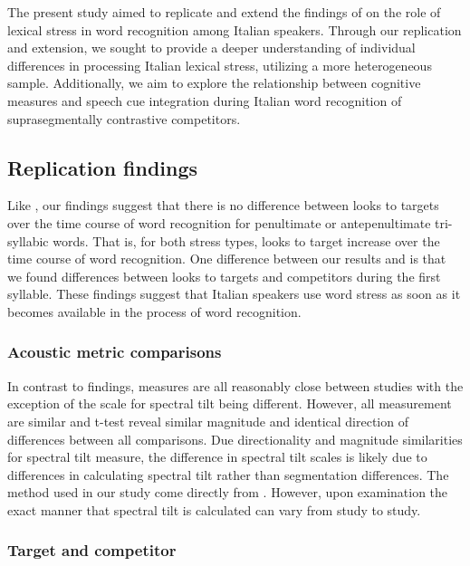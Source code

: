 
The present study aimed to replicate and extend the findings of \cite{Sulpizio_McQueen_2012} on the role of lexical stress in word recognition among Italian speakers. Through our replication and extension, we sought to provide a deeper understanding of individual differences in processing Italian lexical stress, utilizing a more heterogeneous sample. Additionally, we aim to explore the relationship between cognitive measures and speech cue integration during Italian word recognition of suprasegmentally contrastive competitors.

\subsection{Replication findings}
Like \cite{Sulpizio_McQueen_2012}, our findings suggest that there is no difference between looks to targets over the time course of word recognition for penultimate or antepenultimate tri-syllabic words. That is, for both stress types, looks to target increase over the time course of word recognition. One difference between our results and \cite{Sulpizio_McQueen_2012} is that we found differences between looks to targets and competitors during the first syllable. These findings suggest that Italian speakers use word stress as soon as it becomes available in the process of word recognition. 

\subsubsection{Acoustic metric comparisons}
In contrast to \cite{Corretta2023} findings, measures are all reasonably close between studies with the exception of the scale for spectral tilt being different. However, all measurement are similar and t-test reveal similar magnitude and identical direction of differences between all comparisons. Due directionality and magnitude similarities for spectral tilt measure, the difference in spectral tilt scales is likely due to differences in calculating spectral tilt rather than segmentation differences. The method used in our study come directly from \citep{sluijter1996spectral,cutler2007dutch}. However, upon examination the exact manner that spectral tilt is calculated can vary from study to study. 

\subsubsection{Target and competitor}

